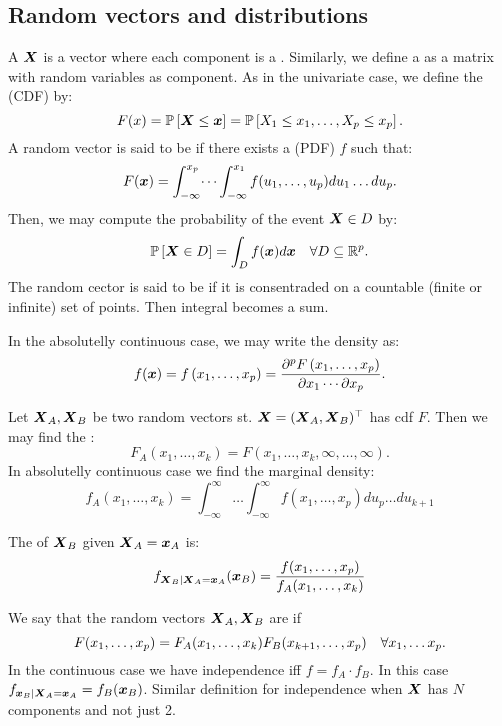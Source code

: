 \subsection{Random vectors and distributions}

A  $\boldsymbol{X}$ is a vector where each component is a . Similarly, we define a  as a matrix with random variables as component. As in the univariate case, we define the  (CDF) by:
$$
    F(x)=\mathbb{P}\left[\boldsymbol{X}\leq \boldsymbol{x}\right] = \mathbb{P}\left[X_1\leq x_1,\dots,X_p\leq x_p\right].
$$
A random vector is said to be  if there exists a  (PDF) $f$ such that:
$$
    F(\boldsymbol{x})=\int_{-\infty}^{x_p}\dots\int_{-\infty}^{x_1} f(u_1,\dots,u_p) du_1\dots du_p.
$$
Then, we may compute the probability of the event $\boldsymbol{X}\in D$ by:
$$
    \mathbb{P}\left[\boldsymbol{X}\in D\right] = \int_D f(\boldsymbol{x}) d\boldsymbol{x} \quad\forall D\subseteq \mathbb{R}^p.
$$
The random cector is said to be  if it is consentraded on a countable (finite or infinite) set of points. Then integral becomes a sum. 

In the absolutelly continuous case, we may write the density as:
$$
    f(\boldsymbol{x})=f\left(x_1, \ldots, x_p\right)=\frac{\partial^p F\left(x_1, \ldots, x_p\right)}{\partial x_1 \cdots \partial x_p}.
$$

Let $\boldsymbol{X}_A, \boldsymbol{X}_B$ be two random vectors st. $\boldsymbol{X}=(\boldsymbol{X}_A,\boldsymbol{X}_B)^\top$ has cdf $F$. Then we may find the :
$$
    F_A(x_1,\dots,x_k) = F(x_1,\dots,x_k,\infty,\dots,\infty).
$$
In absolutelly continuous case we find the marginal density:
$$
    f_A(x_1,\dots,x_k) = \int_{-\infty}^{\infty}\dots\int_{-\infty}^{\infty} f(x_1,\dots,x_p) du_p\dots du_{k+1}
$$

The  of $\boldsymbol{X}_B$ given $\boldsymbol{X}_A = \boldsymbol{x}_A$ is:
$$
    f_{\boldsymbol{X}_B|\boldsymbol{X}_A=\boldsymbol{x}_A}(\boldsymbol{x}_B) = \frac{f(x_1,\dots,x_p)}{f_A(x_1,\dots,x_k)}
$$

We say that the random vectors $\boldsymbol{X}_A, \boldsymbol{X}_B$ are  if 
$$
    F(x_1,\dots,x_p)=F_A(x_1,\dots,x_k)F_B(x_{k+1},\dots,x_p) \quad\forall x_1,\dots x_p.
$$
In the continuous case we have independence iff $f=f_A\cdot f_B$. In this case $f_{\boldsymbol{x}_B|\boldsymbol{X}_A=\boldsymbol{x}_A} = f_B(\boldsymbol{x}_B)$.
Similar definition for independence when $\boldsymbol{X}$ has $N$ components and not just 2.

